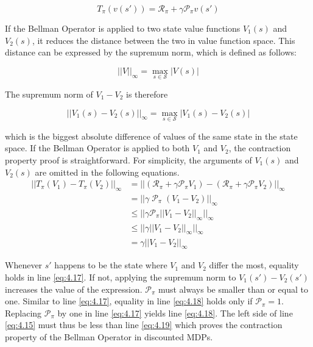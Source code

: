 \begin{equation}
T_\pi(v(s'))=\mathcal{R}_\pi+\gamma \mathcal{P}_\pi v(s')
\label{eq:bellman_operator_discounted}
\end{equation}

If the Bellman Operator is applied to two state value functions $V_1(s)$ and $V_2(s)$, it reduces the distance between the two in value function space. This distance can be expressed by the supremum norm, which is defined as follows:

\begin{equation}
||V||_\infty = \max_{s \in \mathcal{S}} |V(s)|
\end{equation}

The supremum norm of $V_1 - V_2$ is therefore

\begin{equation}
||V_1(s) - V_2(s)||_\infty = \max_{s \in \mathcal{S}} |V_1(s)-V_2(s)|
\end{equation}

which is the biggest absolute difference of values of the same state in the state space. If the Bellman Operator is applied to both $V_1$ and $V_2$, the contraction property proof is straightforward. For simplicity, the arguments of $V_1(s)$ and $V_2(s)$ are omitted in the following equations.
\begin{align}
||T_\pi(V_1)-T_\pi(V_2)||_\infty &= ||(\mathcal{R}_\pi+\gamma \mathcal{P}_\pi V_1)-(\mathcal{R}_\pi+\gamma \mathcal{P}_\pi V_2)||_\infty \label{eq:4.15}\\
&=||\gamma\; \mathcal{P}_\pi\;(V_1 - V_2)||_\infty \label{eq:4.16}\\
&\leq ||\gamma \mathcal{P}_\pi ||V_1 - V_2||_\infty ||_\infty \label{eq:4.17} \\
&\leq ||\gamma ||V_1 - V_2||_\infty ||_\infty \label{eq:4.18}\\
&=\gamma ||V_1 - V_2||_\infty \label{eq:4.19}
\end{align} 

Whenever $s'$ happens to be the state where $V_1$ and $V_2$ differ the most, equality holds in line \ref{eq:4.17}. If not, applying the supremum norm to $V_1(s')-V_2(s')$ increases the value of the expression. $\mathcal{P}_\pi$ must always be smaller than or equal to one. Similar to line \ref{eq:4.17}, equality in line \ref{eq:4.18} holds only if $\mathcal{P}_\pi=1$. Replacing $\mathcal{P}_\pi$ by one in line \ref{eq:4.17} yields line \ref{eq:4.18}. The left side of line \ref{eq:4.15} must thus be less than line \ref{eq:4.19} which proves the contraction property of the Bellman Operator in discounted MDPs.

